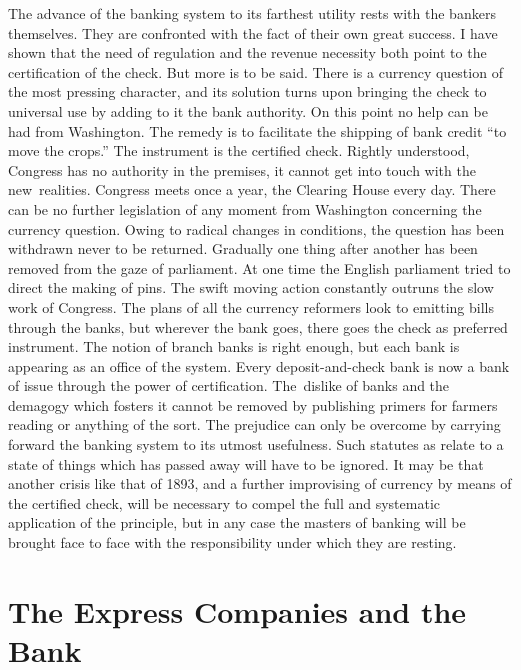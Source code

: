 \documentclass[twoside,symmetric,nobib,justified]{tufte-book}
\let\oldchapter\chapter
\def\chapter{%
  \setcounter{footnote}{0}%
  \oldchapter
}
\begin{document}
The advance of the banking system to its farthest utility rests with the
bankers themselves. They are confronted with the fact of their own great
success. I have shown that the need of regulation and the revenue
necessity both point to the certification of the check. But more is to
be said. There is a currency question of the most pressing character,
and its solution turns upon bringing the check to universal use by
adding to it the bank authority. On this point no help can be had from
Washington. The remedy is to facilitate the shipping of bank credit ``to
move the crops.'' The instrument is the certified check. Rightly
understood, Congress has no authority in the premises, it cannot get
into touch with the new~realities. Congress meets once a year, the
Clearing House every day. There can be no further legislation of any
moment from Washington concerning the currency question. Owing to
radical changes in conditions, the question has been withdrawn never to
be returned. Gradually one thing after another has been removed from the
gaze of parliament. At one time the English parliament tried to direct
the making of pins. The swift moving action constantly outruns the slow
work of Congress. The plans of all the currency reformers look to
emitting bills through the banks, but wherever the bank goes, there goes
the check as preferred instrument. The notion of branch banks is right
enough, but each bank is appearing as an office of the system. Every
deposit-and-check bank is now a bank of issue through the power of
certification. The~dislike of banks and the demagogy which fosters it
cannot be removed by publishing primers for farmers\textquotesingle{}
reading or anything of the sort. The prejudice can only be overcome by
carrying forward the banking system to its utmost usefulness. Such
statutes as relate to a state of things which has passed away will have
to be ignored. It may be that another crisis like that of 1893, and a
further improvising of currency by means of the certified check, will be
necessary to compel the full and systematic application of the
principle, but in any case the masters of banking will be brought face
to face with the responsibility under which they are resting.


\chapter[The Express Companies and the Bank]{The Express Companies and the Bank}
\label{ch:The Express Companies and the Bank}
\end{document}
